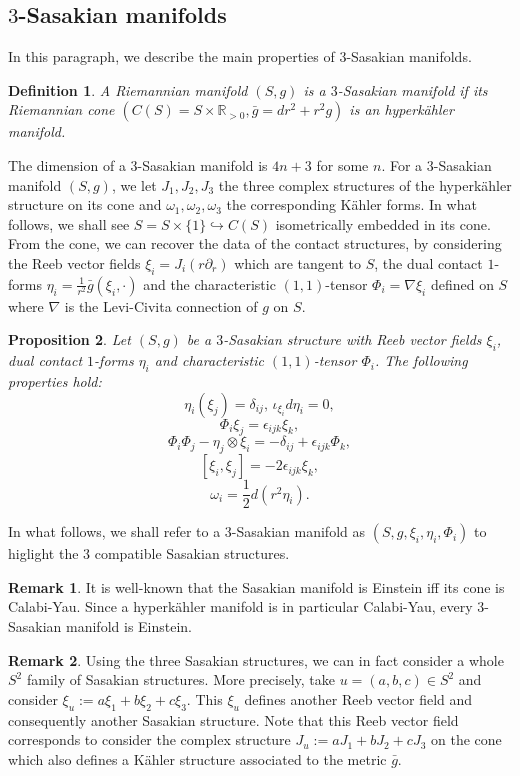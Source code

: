 \documentclass[12pt, reqno]{amsart}
\newtheorem{Def}{Definition}[subsection]
\newtheorem{prop}[Def]{Proposition}
\theoremstyle{definition}
\newtheorem{rk}{Remark}[subsection]
\newcommand{\R}{\mathbb{R}}
\begin{document}
\subsection{$3$-Sasakian manifolds}\label{3.2} In this paragraph, we describe the main properties of $3$-Sasakian manifolds. 
\begin{Def}
    A Riemannian manifold $(S,g)$ is a $3$-Sasakian manifold if its Riemannian cone $(C(S)=S\times\R_{>0},\bar g=dr^2+r^2g)$ is an hyperkähler manifold.
\end{Def}
The dimension of a $3$-Sasakian manifold is $4n+3$ for some $n$. For a $3$-Sasakian manifold $(S,g)$, we let $J_1,J_2,J_3$ the three complex structures of the hyperkähler structure on its cone and $\omega_1,\omega_2,\omega_3$ the corresponding Kähler forms. In what follows, we shall see $S=S\times\{1\}\hookrightarrow C(S)$ isometrically embedded in its cone. From the cone, we can recover the data of the contact structures, by considering the Reeb vector fields $\xi_i=J_i(r\partial_r)$ which are tangent to $S$, the dual contact $1$-forms $\eta_i=\frac{1}{r^2}\bar g(\xi_i,\cdot)$ and the characteristic $(1,1)$-tensor $\Phi_i=\nabla\xi_i$ defined on $S$ where $\nabla$ is the Levi-Civita connection of $g$ on $S$.
\begin{prop}\cite{Boyer:1998sf}\label{trisasakien} Let $(S,g)$ be a $3$-Sasakian structure with Reeb vector fields $\xi_i$, dual contact $1$-forms $\eta_i$ and characteristic $(1,1)$-tensor $\Phi_i$. The following properties hold:
$$\eta_i(\xi_j)=\delta_{ij},\,\iota_{\xi_i}d\eta_i=0,$$ $$\Phi_i\xi_j=\epsilon_{ijk}\xi_k,$$ $$\Phi_i\Phi_j-\eta_j\otimes\xi_i=-\delta_{ij}+\epsilon_{ijk}\Phi_k,$$ $$[\xi_i,\xi_j]=-2\epsilon_{ijk}\xi_k,$$ $$\omega_i=\frac{1}{2}d(r^2\eta_i).$$

\end{prop}
In what follows, we shall refer to a $3$-Sasakian manifold as $(S,g,\xi_i,\eta_i,\Phi_i)$ to higlight the $3$ compatible Sasakian structures.
\begin{rk}
    It is well-known that the Sasakian manifold is Einstein iff its cone is Calabi-Yau. Since a hyperkähler manifold is in particular Calabi-Yau, every $3$-Sasakian manifold is Einstein.
\end{rk}
\begin{rk}
    Using the three Sasakian structures, we can in fact consider a whole $S^2$ family of Sasakian structures. More precisely, take $u=(a,b,c)\in S^2$ and consider $\xi_u:=a\xi_1+b\xi_2+c\xi_3$. This $\xi_u$ defines another Reeb vector field and consequently another Sasakian structure. Note that this Reeb vector field corresponds to consider the complex structure $J_u:=aJ_1+bJ_2+cJ_3$ on the cone which also defines a Kähler structure associated to the metric $\bar g$. 
\end{rk}
\end{document}
